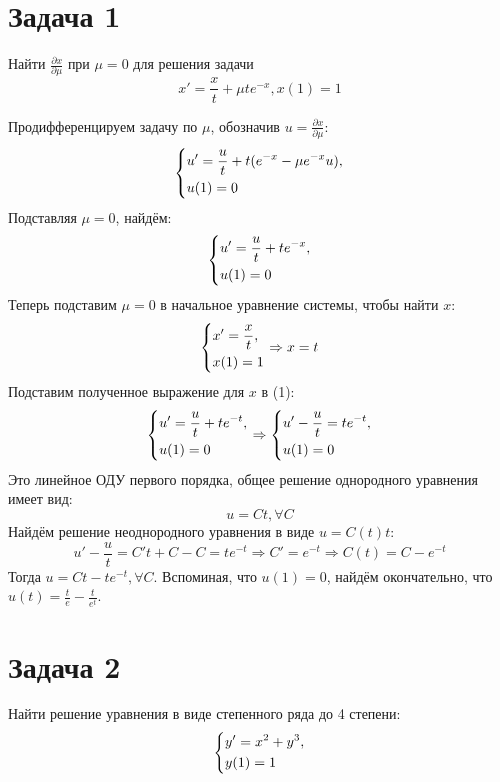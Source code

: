 \documentclass[11pt]{article}
\author{Sergey Makarov}
\date{\today}
\title{}
\begin{document}
\section{Задача 1}
\label{sec:orgd868644}
Найти \(\frac{\partial x}{\partial\mu}\) при \(\mu = 0\) для решения задачи
$$x' = \frac{x}t + \mu te^{-x}, x(1) = 1$$

Продифференцируем задачу по \(\mu\), обозначив \(u = \frac{\partial x}{\partial\mu}\):
\begin{equation*}
\begin{dcases}
u' = \frac ut + t(e^{-x} - \mu e^{-x}u), \\
u(1) = 0
\end{dcases}
\end{equation*}
Подставляя \(\mu = 0\), найдём:
\begin{equation}
\begin{dcases}
u' = \frac{u}t + te^{-x}, \\
u(1) = 0
\end{dcases}
\end{equation}
Теперь подставим \(\mu = 0\) в начальное уравнение системы, чтобы найти \(x\):
\begin{equation*}
\begin{dcases}
x' = \frac{x}t, \\
x(1) = 1
\end{dcases}
\Rightarrow x = t
\end{equation*}
Подставим полученное выражение для \(x\) в (1):
\begin{equation*}
\begin{dcases}
u' = \frac{u}t + te^{-t}, \\
u(1) = 0
\end{dcases}
\Rightarrow
\begin{dcases}
u' - \frac{u}t = te^{-t}, \\
u(1) = 0
\end{dcases}
\end{equation*}
Это линейное ОДУ первого порядка, общее решение однородного уравнения имеет вид:
$$u = Ct, \forall C$$
Найдём решение неоднородного уравнения в виде \(u = C(t)t\):
\begin{equation*}
u' - \frac{u}t = C't + C - C = te^{-t} \Rightarrow C' = e^{-t} \Rightarrow C(t) = C - e^{-t}
\end{equation*}
Тогда \(u = Ct - te^{-t}, \forall C\).
Вспоминая, что \(u(1) = 0\), найдём окончательно, что \(u(t) = \frac{t}e - \frac{t}{e^t}\).
\section{Задача 2}
\label{sec:orgc81d4a8}
Найти решение уравнения в виде степенного ряда до 4 степени:
\begin{equation*}
\begin{dcases}
y' = x^2 + y^3, \\
y(1) = 1
\end{dcases}
\end{equation*}
\end{document}
